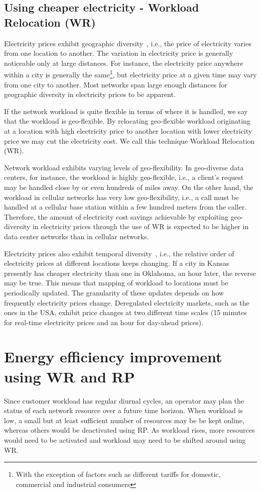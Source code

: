 \subsection{Using cheaper electricity - Workload Relocation (WR)}
Electricity prices exhibit geographic diversity~\cite{qureshiHotnets}, i.e., the price of electricity varies from one location to another. The variation in electricity price is generally noticeable only at large distances. For instance, the electricity price anywhere within a city is generally the same\footnote{With the exception of factors such as different tariffs for domestic, commercial and industrial consumers}, but electricity price at a given time may vary from one city to another. Most networks span large enough distances for geographic diversity in electricity prices to be apparent. 

If the network workload is quite flexible in terms of where it is handled, we say that the workload is geo-flexible. By relocating geo-flexible workload originating at a location with high electricity price to another location with lower electricity price we may cut the electricity cost. We call this technique Workload Relocation (WR). 

Network workload exhibits varying levels of geo-flexibility. In geo-diverse data centers, for instance, the workload is highly geo-flexible, i.e., a client's request may be handled close by or even hundreds of miles away. On the other hand, the workload in cellular networks has very low geo-flexibility, i.e., a call must be handled at a cellular base station within a few hundred meters from the caller. Therefore, the amount of electricity cost savings achievable by exploiting geo-diversity in electricity prices through the use of WR is expected to be higher in data center networks than in cellular networks.

Electricity prices also exhibit temporal diversity~\cite{qureshiHotnets}, i.e., the relative order of electricity prices at different locations keeps changing. If a city in Kansas presently has cheaper electricity than one in Oklahoma, an hour later, the reverse may be true. This means that mapping of workload to locations must be periodically updated. The granularity of these updates depends on how frequently electricity prices change. Deregulated electricity markets, such as the ones in the USA, exhibit price changes at two different time scales (15 minutes for real-time electricity prices and an hour for day-ahead prices). 

\section{Energy efficiency improvement using WR and RP}
Since customer workload has regular diurnal cycles, an operator may plan the status of each network resource over a future time horizon. When workload is low, a small but at least sufficient number of resources may be be kept online, whereas others would be deactivated using RP. As workload rises, more resources would need to be activated and workload may need to be shifted around using WR. 

